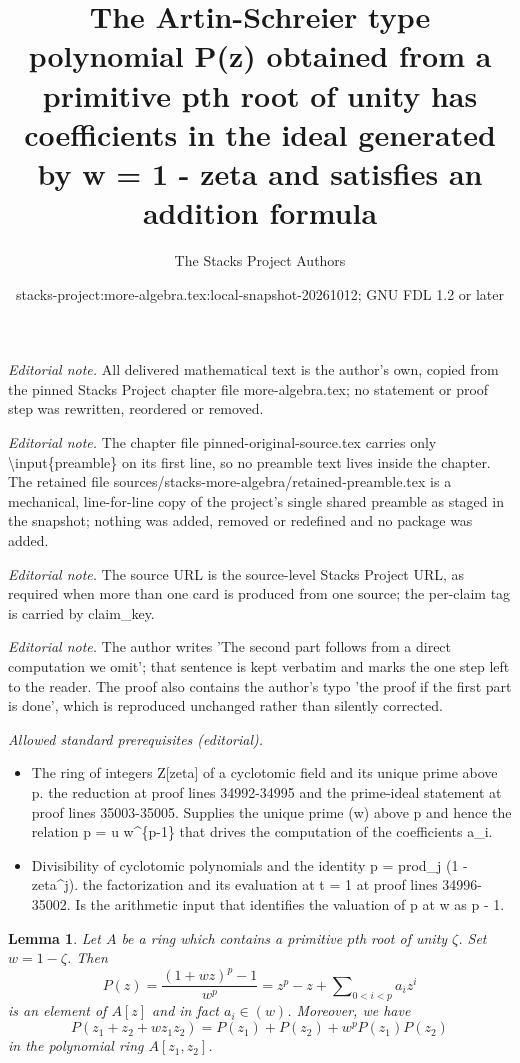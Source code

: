 \documentclass[10pt,a4paper]{amsart}
\title{The Artin-Schreier type polynomial P(z) obtained from a primitive pth root of unity has coefficients in the ideal generated by w = 1 - zeta and satisfies an addition formula}
\author{The Stacks Project Authors}
\date{stacks-project:more-algebra.tex:local-snapshot-20261012; GNU FDL 1.2 or later}
\theoremstyle{plain}
\newtheorem{lemma}[subsection]{Lemma}
\theoremstyle{definition}
\theoremstyle{remark}
\numberwithin{equation}{subsection}
\begin{document}
\maketitle
\setcounter{subsection}{1}
\noindent\textit{Editorial note.} All delivered mathematical text is the author's own, copied from the pinned Stacks Project chapter file more-algebra.tex; no statement or proof step was rewritten, reordered or removed.\par\medskip
\noindent\textit{Editorial note.} The chapter file pinned-original-source.tex carries only \textbackslash{}input\{preamble\} on its first line, so no preamble text lives inside the chapter. The retained file sources/stacks-more-algebra/retained-preamble.tex is a mechanical, line-for-line copy of the project's single shared preamble as staged in the snapshot; nothing was added, removed or redefined and no package was added.\par\medskip
\noindent\textit{Editorial note.} The source URL is the source-level Stacks Project URL, as required when more than one card is produced from one source; the per-claim tag is carried by claim\_key.\par\medskip
\noindent\textit{Editorial note.} The author writes 'The second part follows from a direct computation we omit'; that sentence is kept verbatim and marks the one step left to the reader. The proof also contains the author's typo 'the proof if the first part is done', which is reproduced unchanged rather than silently corrected.\par\medskip
\noindent\textit{Allowed standard prerequisites (editorial).}\begin{itemize}
\item The ring of integers Z[zeta] of a cyclotomic field and its unique prime above p. the reduction at proof lines 34992-34995 and the prime-ideal statement at proof lines 35003-35005. Supplies the unique prime (w) above p and hence the relation p = u w\textasciicircum{}\{p-1\} that drives the computation of the coefficients a\_i.
\item Divisibility of cyclotomic polynomials and the identity p = prod\_j (1 - zeta\textasciicircum{}j). the factorization and its evaluation at t = 1 at proof lines 34996-35002. Is the arithmetic input that identifies the valuation of p at w as p - 1.
\end{itemize}\medskip
\begin{lemma}
\label{lemma-prepare}
Let $A$ be a ring which contains a primitive $p$th root of unity $\zeta$.
Set $w = 1 - \zeta$. Then
$$
P(z) = \frac{(1 + wz)^p - 1}{w^p} =
z^p - z + \sum\nolimits_{0 < i < p} a_i z^i
$$
is an element of $A[z]$ and in fact $a_i \in (w)$. Moreover, we have
$$
P(z_1 + z_2 + w z_1 z_2) = P(z_1) + P(z_2) + w^p P(z_1) P(z_2)
$$
in the polynomial ring $A[z_1, z_2]$.
\end{lemma}
\end{document}
